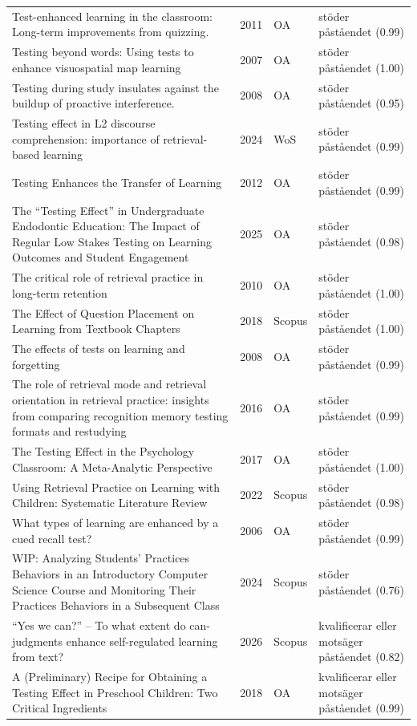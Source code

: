 \begin{longtable}{@{}%
  >{\raggedright\arraybackslash}p{}c%
  >{\raggedright\arraybackslash}p{}%
  >{\raggedright\arraybackslash}p{}@{}}
Test-enhanced learning in the classroom: Long-term improvements from quizzing. & 2011 & OA & stöder påståendet (0.99) \\
Testing beyond words: Using tests to enhance visuospatial map learning & 2007 & OA & stöder påståendet (1.00) \\
Testing during study insulates against the buildup of proactive interference. & 2008 & OA & stöder påståendet (0.95) \\
Testing effect in L2 discourse comprehension: importance of retrieval-based learning & 2024 & WoS & stöder påståendet (0.99) \\
Testing Enhances the Transfer of Learning & 2012 & OA & stöder påståendet (0.99) \\
The ``Testing Effect'' in Undergraduate Endodontic Education: The Impact of Regular Low Stakes Testing on Learning Outcomes and Student Engagement & 2025 & OA & stöder påståendet (0.98) \\
The critical role of retrieval practice in long-term retention & 2010 & OA & stöder påståendet (1.00) \\
The Effect of Question Placement on Learning from Textbook Chapters & 2018 & Scopus & stöder påståendet (1.00) \\
The effects of tests on learning and forgetting & 2008 & OA & stöder påståendet (0.99) \\
The role of retrieval mode and retrieval orientation in retrieval practice: insights from comparing recognition memory testing formats and restudying & 2016 & OA & stöder påståendet (0.99) \\
The Testing Effect in the Psychology Classroom: A Meta-Analytic Perspective & 2017 & OA & stöder påståendet (1.00) \\
Using Retrieval Practice on Learning with Children: Systematic Literature Review & 2022 & Scopus & stöder påståendet (0.98) \\
What types of learning are enhanced by a cued recall test? & 2006 & OA & stöder påståendet (0.99) \\
WIP: Analyzing Students' Practices Behaviors in an Introductory Computer Science Course and Monitoring Their Practices Behaviors in a Subsequent Class & 2024 & Scopus & stöder påståendet (0.76) \\
``Yes we can?'' -- To what extent do can-judgments enhance self-regulated learning from text? & 2026 & Scopus & kvalificerar eller motsäger påståendet (0.82) \\
A (Preliminary) Recipe for Obtaining a Testing Effect in Preschool Children: Two Critical Ingredients & 2018 & OA & kvalificerar eller motsäger påståendet (0.99) \\

\end{longtable}
